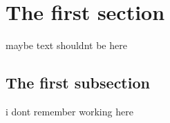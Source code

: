 \documentclass{resume}
\begin{document}
\section{The first section}
maybe text shouldnt be here
\subsection{The first subsection}
i dont remember working here
\end{document}
